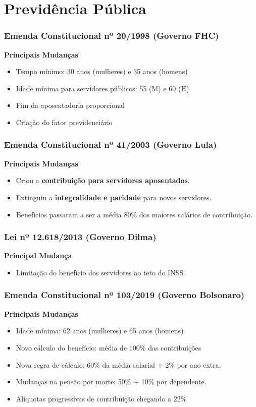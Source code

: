 \section{Previdência Pública}

\begin{frame}[c]\frametitle{Emenda Constitucional nº 20/1998 (Governo FHC)}
  \textbf{Principais Mudanças}
  \begin{itemize}
    \item Tempo mínimo: 30 anos (mulheres) e 35 anos (homens)
    \item Idade mínima para servidores públicos: 55 (M) e 60 (H)
    \item Fim da aposentadoria proporcional
    \item Criação do fator previdenciário
  \end{itemize}
\end{frame}

\begin{frame}[c]\frametitle{Emenda Constitucional nº 41/2003 (Governo Lula)}
  \textbf{Principais Mudanças}
  \begin{itemize}
    \item Criou a \textbf{contribuição para servidores aposentados}.
    \item Extinguiu a \textbf{integralidade e paridade} para novos servidores.
    \item Benefícios passaram a ser a média $80\%$ dos maiores salários de contribuição.
  \end{itemize}
\end{frame}

\begin{frame}[c]\frametitle{Lei nº 12.618/2013 (Governo Dilma)}
  \textbf{Principal Mudança}
  \begin{itemize}
    \item Limitação do benefício dos servidores ao teto do INSS
  \end{itemize}
\end{frame}

\begin{frame}[c]\frametitle{Emenda Constitucional nº 103/2019 (Governo Bolsonaro)}
  \textbf{Principais Mudanças}
  \begin{itemize}
    \item Idade mínima: 62 anos (mulheres) e 65 anos (homens)
    \item Novo cálculo do benefício: média de $100\%$ das contribuições
    \item Nova regra de cálculo: 60\% da média salarial + 2\% por ano extra.
    \item Mudanças na pensão por morte: 50\% + 10\% por dependente.
    \item Alíquotas progressivas de contribuição chegando a $22\%$
  \end{itemize}
\end{frame}